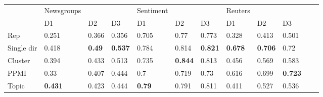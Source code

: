 \begin{landscape}
\begin{table}[]
\begin{tabular}{llll@{\hskip 0.25in}lll@{\hskip 0.25in}lllll}
			& Newsgroups                      &                                 &                                 & Sentiment                       &                                 &                                 & Reuters                         &                                 &                                 &             &             \\
			& D1                              & D2                              & D3                              & D1                              & D2                              & D3                              & D1                              & D2                              & D3                              &             &             \\
			
			\toprule[\heavyrulewidth]
			Rep               & 0.251                           & 0.366                           & 0.356                           & 0.705                           & 0.77                            & 0.773                           & 0.328                           & 0.413                           & 0.501                           &             &             \\
			Single dir        & 0.418                           & \textbf{0.49}  & \textbf{0.537} & 0.784                           & 0.814                           & \textbf{0.821} & \textbf{0.678} & \textbf{0.706} & 0.72                            &             &             \\
			Cluster           & 0.394                           & 0.433                           & 0.513                           & 0.735                           & \textbf{0.844} & 0.813                           & 0.456                           & 0.569                           & 0.583                           &             &             \\
			PPMI              & 0.33                            & 0.407                           & 0.444                           & 0.7                             & 0.719                           & 0.73                            & 0.616                           & 0.699                           & \textbf{0.723} &             &             \\
			Topic             & \textbf{0.431} & 0.423                           & 0.444                           & \textbf{0.79}  & 0.791                           & 0.811                           & 0.411                           & 0.527                           & 0.536                           &             &             \\

\end{tabular}
\end{table}
\end{landscape}
